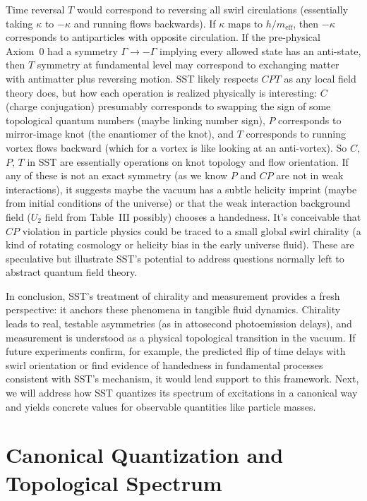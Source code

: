 \documentclass[10pt,reprint,aps,onecolumn,nofootinbib]{revtex4-2}
\begin{document}
Time reversal $T$ would correspond to reversing all swirl circulations (essentially taking $\kappa$ to $-\kappa$ and running flows backwards). If $\kappa$ maps to $h/m_{\mathrm{eff}}$, then $-\kappa$ corresponds to antiparticles with opposite circulation. If the pre-physical Axiom~0 had a symmetry $\Gamma \to -\Gamma$ implying every allowed state has an anti-state, then $T$ symmetry at fundamental level may correspond to exchanging matter with antimatter plus reversing motion. SST likely respects $CPT$ as any local field theory does, but how each operation is realized physically is interesting: $C$ (charge conjugation) presumably corresponds to swapping the sign of some topological quantum numbers (maybe linking number sign), $P$ corresponds to mirror-image knot (the enantiomer of the knot), and $T$ corresponds to running vortex flows backward (which for a vortex is like looking at an anti-vortex). So $C$, $P$, $T$ in SST are essentially operations on knot topology and flow orientation. If any of these is not an exact symmetry (as we know $P$ and $CP$ are not in weak interactions), it suggests maybe the vacuum has a subtle helicity imprint (maybe from initial conditions of the universe) or that the weak interaction background field ($U_2$ field from Table~III possibly) chooses a handedness. It's conceivable that $CP$ violation in particle physics could be traced to a small global swirl chirality (a kind of rotating cosmology or helicity bias in the early universe fluid). These are speculative but illustrate SST’s potential to address questions normally left to abstract quantum field theory.


In conclusion, SST’s treatment of chirality and measurement provides a fresh perspective: it anchors these phenomena in tangible fluid dynamics. Chirality leads to real, testable asymmetries (as in attosecond photoemission delays), and measurement is understood as a physical topological transition in the vacuum. If future experiments confirm, for example, the predicted flip of time delays with swirl orientation or find evidence of handedness in fundamental processes consistent with SST’s mechanism, it would lend support to this framework. Next, we will address how SST quantizes its spectrum of excitations in a canonical way and yields concrete values for observable quantities like particle masses.


\section{Canonical Quantization and Topological Spectrum}
\end{document}
